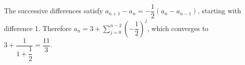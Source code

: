 The successive differences satisfy $ a_{n+1}-a_n=-\dfrac{1}{2}(a_n-a_{n-1})$, starting with difference 1. Therefore $ a_n=3+\sum_{j=0}^{n-2}(-\dfrac{1}{2})^j $, which converges to $ 3+\dfrac{1}{1+\dfrac{1}{2}}=\boxed{\dfrac{11}{3}}$.
